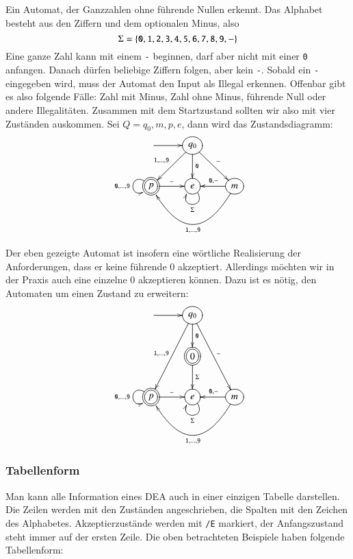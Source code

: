 \begin{beispiel}
Ein Automat, der Ganzzahlen ohne führende Nullen erkennt.
Das Alphabet besteht aus den Ziffern und dem optionalen Minus, also
\[
\Sigma=\{
{\tt 0},
{\tt 1},
{\tt 2},
{\tt 3},
{\tt 4},
{\tt 5},
{\tt 6},
{\tt 7},
{\tt 8},
{\tt 9},
{\tt -}
\}
\]
Eine ganze Zahl kann mit einem {\tt -} beginnen, darf
aber nicht mit einer {\tt 0} anfangen.
Danach dürfen beliebige
Ziffern folgen, aber kein {\tt -}.
Sobald ein {\tt -} eingegeben
wird, muss der Automat den Input als Illegal erkennen.
Offenbar gibt es also folgende Fälle: Zahl mit Minus, Zahl ohne Minus,
führende Null oder andere Illegalitäten.
Zusammen mit dem Startzustand sollten wir also mit vier Zuständen auskommen.
Sei $Q={q_0, m,p,e}$, dann wird das Zustandsdiagramm:
\[
\entrymodifiers={++[o][F]}
\xymatrix{
*+\txt{}\ar[r]
	&{q_0}  \ar[dl]_{{\tt 1},\dots,{\tt 9}} \ar[d]^{\tt 0} \ar[dr]^{\tt -}
\\
*++[o][F=]{p}\ar[r]^{\tt -} \ar@(ul,dl)_{{\tt 0},\dots,{\tt 9}}
	&{e} \ar@(dr,dl)^{\Sigma}
		&{m}\ar[l]_{{\tt 0},{\tt -}} \ar@/^40pt/[ll]^{{\tt 1},\dots,{\tt 9}}
}
\]
\end{beispiel}
\begin{beispiel}
Der eben gezeigte Automat ist insofern eine wörtliche Realisierung
der Anforderungen, dass er keine führende $0$ akzeptiert.
Allerdings
möchten wir in der Praxis auch eine einzelne $0$ akzeptieren können.
Dazu ist es nötig, den Automaten um einen Zustand zu erweitern:
\[
\entrymodifiers={++[o][F]}
\xymatrix{
*+\txt{}\ar[r]
	&{q_0}  \ar[ddl]_{{\tt 1},\dots,{\tt 9}} \ar[d]^{\tt 0} \ar[ddr]^{\tt -}
\\
*+\txt{}
	&*++[o][F=]{0}\ar[d]^{\Sigma}
\\
*++[o][F=]{p}\ar[r]^{\tt -} \ar@(ul,dl)_{{\tt 0},\dots,{\tt 9}}
	&{e} \ar@(dr,dl)^{\Sigma}
		&{m}\ar[l]_{{\tt 0},{\tt -}} \ar@/^40pt/[ll]^{{\tt 1},\dots,{\tt 9}}
}
\]
\end{beispiel}

\subsubsection{Tabellenform}
Man kann alle Information eines DEA auch in einer einzigen Tabelle 
darstellen.
Die Zeilen werden mit den Zuständen angeschrieben,
die Spalten mit den Zeichen des Alphabetes.
Akzeptierzustände werden
mit {\tt /E} markiert, der Anfangszustand steht immer auf der ersten
Zeile.
Die oben betrachteten Beispiele haben folgende Tabellenform:

